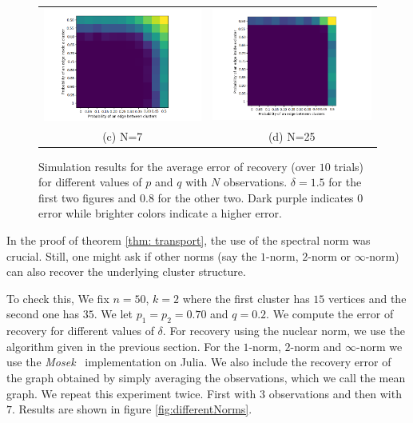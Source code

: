 \documentclass[12pt]{amsart}
\theoremstyle{remark}
\begin{document}
\begin{figure}[H]
\begin{tabular}{cc}
 \includegraphics[width=85mm]{./Pictures/Variapq7.PNG} &   \includegraphics[width=85mm]{./Pictures/Variapq25.PNG} \\
(c) N=7 & (d) N=25\\[6pt]

\end{tabular}
\caption{Simulation results for the average error of recovery (over $10$ trials) for different values of $p$ and $q$ with $N$ observations. $\delta = 1.5$ for the first two figures and $0.8$ for the other two. Dark purple indicates 0 error while brighter colors indicate a higher error.}
        \label{fig:Variapq}
\end{figure}

In the proof of theorem \ref{thm: transport}, the use of the spectral norm was crucial. Still, one might ask if other norms (say the $1$-norm, $2$-norm or $\infty$-norm) can also recover the underlying cluster structure.

To check this, We fix $n=50$, $k=2$ where the first cluster has $15$ vertices and the second one has $35$. We let $p_1 = p_2 = 0.70$ and $q=0.2$. We compute the error of recovery for different values of $\delta$. For recovery using the nuclear norm, we use the algorithm given in the previous section. For the $1$-norm, $2$-norm and $\infty$-norm we use the \textit{Mosek}~\cite{Mosek} implementation on Julia. 
We also include the recovery error of the graph obtained by simply averaging the observations, which we call the mean graph.
We repeat this experiment twice. First with $3$ observations and then with $7$.
Results are shown in figure \ref{fig:differentNorms}.
\end{document}
